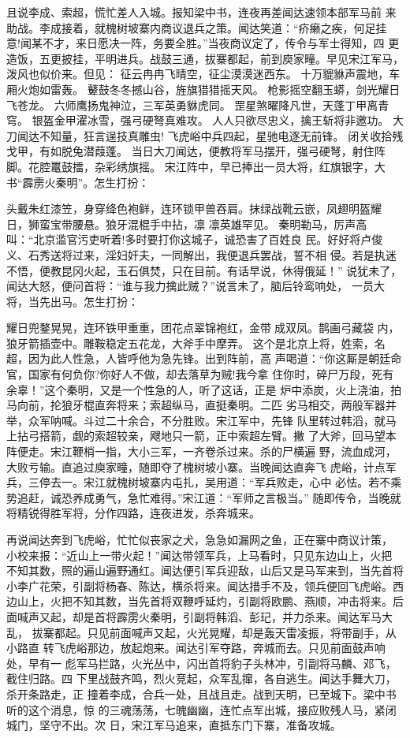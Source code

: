 且说李成、索超，慌忙差人入城。报知梁中书，连夜再差闻达速领本部军马前
来助战。李成接着，就槐树坡寨内商议退兵之策。闻达笑道：“疥癞之疾，何足挂
意!闻某不才，来日愿决一阵，务要全胜。”当夜商议定了，传令与军士得知，四
更造饭，五更披挂，平明进兵。战鼓三通，拔寨都起，前到庾家疃。早见宋江军马，
泼风也似价来。但见：
征云冉冉飞晴空，征尘漠漠迷西东。
十万貔貅声震地，车厢火炮如雷轰。
鼙鼓冬冬撼山谷，旌旗猎猎摇天风。
枪影摇空翻玉蟒，剑光耀日飞苍龙。
六师鹰扬鬼神泣，三军英勇貅虎同。
罡星煞曜降凡世，天蓬丁甲离青穹。
银盔金甲濯冰雪，强弓硬弩真难攻。
人人只欲尽忠义，擒王斩将非邀功。
大刀闻达不知量，狂言逞技真雕虫!
飞虎峪中兵四起，星驰电逐无前锋。
闭关收拾残戈甲，有如脱兔潜葭蓬。
当日大刀闻达，便教将军马摆开，强弓硬弩，射住阵脚。花腔鼍鼓擂，杂彩绣旗摇。
宋江阵中，早已捧出一员大将，红旗银字，大书“霹雳火秦明”。怎生打扮：

头戴朱红漆笠，身穿绛色袍鲜，连环锁甲兽吞肩。抹绿战靴云嵌，凤翅明盔耀
日，狮蛮宝带腰悬。狼牙混棍手中拈，凛
凛英雄罕见。
秦明勒马，厉声高叫：“北京滥官污吏听着!多时要打你这城子，诚恐害了百姓良
民。好好将卢俊义、石秀送将过来，淫妇奸夫，一同解出，我便退兵罢战，誓不相
侵。若是执迷不悟，便教昆冈火起，玉石俱焚，只在目前。有话早说，休得俄延！”
说犹未了，闻达大怒，便问首将：“谁与我力擒此贼？”说言未了，脑后铃鸾响处，
一员大将，当先出马。怎生打扮：

耀日兜鍪晃晃，连环铁甲重重，团花点翠锦袍红，金带成双凤。鹊画弓藏袋
内，狼牙箭插壶中。雕鞍稳定五花龙，大斧手中摩弄。
这个是北京上将，姓索，名超，因为此人性急，人皆呼他为急先锋。出到阵前，高
声喝道：“你这厮是朝廷命官，国家有何负你?你好人不做，却去落草为贼!我今拿
住你时，碎尸万段，死有余辜！”这个秦明，又是一个性急的人，听了这话，正是
炉中添炭，火上浇油，拍马向前，抡狼牙棍直奔将来；索超纵马，直挺秦明。二匹
劣马相交，两般军器并举，众军呐喊。斗过二十余合，不分胜败。宋江军中，先锋
队里转过韩滔，就马上拈弓搭箭，觑的索超较亲，飕地只一箭，正中索超左臂。撇
了大斧，回马望本阵便走。宋江鞭梢一指，大小三军，一齐卷杀过来。杀的尸横遍
野，流血成河，大败亏输。直追过庾家疃，随即夺了槐树坡小寨。当晚闻达直奔飞
虎峪，计点军兵，三停去一。宋江就槐树坡寨内屯扎，吴用道：“军兵败走，心中
必怯。若不乘势追赶，诚恐养成勇气，急忙难得。”宋江道：“军师之言极当。”
随即传令，当晚就将精锐得胜军将，分作四路，连夜进发，杀奔城来。

再说闻达奔到飞虎峪，忙忙似丧家之犬，急急如漏网之鱼，正在寨中商议计策，
小校来报：“近山上一带火起！”闻达带领军兵，上马看时，只见东边山上，火把
不知其数，照的遍山遍野通红。闻达便引军兵迎敌，山后又是马军来到，当先首将
小李广花荣，引副将杨春、陈达，横杀将来。闻达措手不及，领兵便回飞虎峪。西
边山上，火把不知其数，当先首将双鞭呼延灼，引副将欧鹏、燕顺，冲击将来。后
面喊声又起，却是首将霹雳火秦明，引副将韩滔、彭玘，并力杀来。闻达军马大乱，
拔寨都起。只见前面喊声又起，火光晃耀，却是轰天雷凌振，将带副手，从小路直
转飞虎峪那边，放起炮来。闻达引军夺路，奔城而去。只见前面鼓声响处，早有一
彪军马拦路，火光丛中，闪出首将豹子头林冲，引副将马麟、邓飞，截住归路。四
下里战鼓齐鸣，烈火竞起，众军乱撺，各自逃生。闻达手舞大刀，杀开条路走，正
撞着李成，合兵一处，且战且走。战到天明，已至城下。梁中书听的这个消息，惊
的三魂荡荡，七魄幽幽，连忙点军出城，接应败残人马，紧闭城门，坚守不出。次
日，宋江军马追来，直抵东门下寨，准备攻城。

